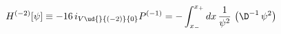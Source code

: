\begin{equation*}
  H^{(-2)}[\psi] \equiv -16\,i_{V\ud{}{(-2)}{0}}P^{(-1)} =
 - \int_{x_-}^{x_+}dx\,\frac{1}{\psi^2}\,\left(\D^{-1}\,\psi^2\right)\,
\end{equation*}

